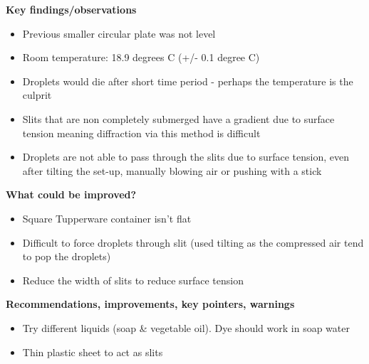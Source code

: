 \textbf{Key findings/observations}

\begin{itemize}
\item Previous smaller circular plate was not level
\item Room temperature: 18.9 degrees C (+/- 0.1 degree C)
\item Droplets would die after short time period - perhaps the temperature is the culprit
\item Slits that are non completely submerged have a gradient due to surface tension meaning diffraction via this method is difficult
\item Droplets are not able to pass through the slits due to surface tension, even after tilting the set-up, manually blowing air or pushing with a stick
\end{itemize}
\bigskip

\textbf{What could be improved?}

\begin{itemize}
\item Square Tupperware container isn't flat
\item Difficult to force droplets through slit (used tilting as the compressed air tend to pop the droplets)
\item Reduce the width of slits to reduce surface tension
\end{itemize}

\bigskip


\textbf{Recommendations, improvements, key pointers, warnings}

\begin{itemize}
\item Try different liquids (soap \& vegetable oil). Dye should work in soap water
\item Thin plastic sheet to act as slits
\end{itemize}
